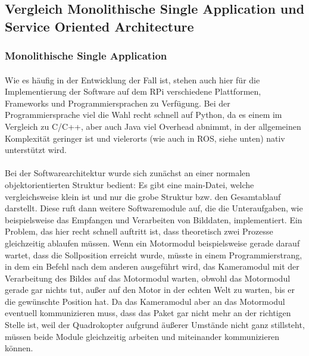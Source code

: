 \subsection{Vergleich Monolithische Single Application und Service Oriented Architecture}
\subsubsection{Monolithische Single Application}
\paragraph{}
Wie es häufig in der Entwicklung der Fall ist, stehen auch hier für die Implementierung
der Software auf dem RPi verschiedene Plattformen, Frameworks und
Programmiersprachen zu Verfügung. Bei der Programmiersprache viel die Wahl recht
schnell auf Python, da es einem im Vergleich zu C/C++, aber auch Java viel Overhead
abnimmt, in der allgemeinen Komplexität geringer ist und vielerorts (wie auch in ROS,
siehe unten) nativ unterstützt wird.
\paragraph{}
Bei der Softwarearchitektur wurde sich zunächst an einer normalen objektorientierten Struktur bedient: Es gibt eine main-Datei, welche vergleichsweise
klein ist und nur die grobe Struktur bzw. den Gesamtablauf darstellt. Diese ruft dann weitere Softwaremodule auf, die die Unteraufgaben, wie beispielsweise das Empfangen und Verarbeiten von Bilddaten, implementiert. Ein Problem, das hier recht schnell auftritt ist, dass theoretisch zwei Prozesse gleichzeitig ablaufen müssen. Wenn ein Motormodul beispielsweise gerade darauf wartet, dass die Sollposition erreicht wurde, müsste in einem Programmierstrang, in dem ein Befehl nach dem anderen ausgeführt wird, das Kameramodul mit der Verarbeitung des Bildes auf das Motormodul warten, obwohl das Motormodul gerade gar nichts tut, außer auf den
Motor in der echten Welt zu warten, bis er die gewünschte Position hat. Da das Kameramodul aber an das Motormodul eventuell kommunizieren muss, dass das
Paket gar nicht mehr an der richtigen Stelle ist, weil der Quadrokopter aufgrund äußerer Umstände nicht ganz stillsteht, müssen beide Module gleichzeitig arbeiten und
miteinander kommunizieren können. 
